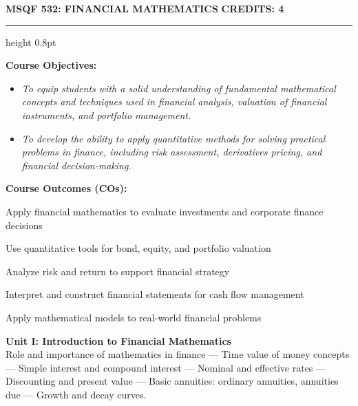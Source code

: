 
\newpage
\thispagestyle{plain}

\begin{center}
    {\large\textbf{MSQF 532: FINANCIAL MATHEMATICS}} \hfill {\large\textbf{CREDITS: 4}}
\end{center}
\vspace{-0.6em}
\hrule height 0.8pt
\vspace{0.6em}

\noindent\textbf{Course Objectives:}
\begin{itemize}[leftmargin=1.5em, label=$\bullet$, noitemsep, topsep=1pt, parsep=1pt]
    \item \textit{To equip students with a solid understanding of fundamental mathematical concepts and techniques used in financial analysis, valuation of financial instruments, and portfolio management.}
    \item \textit{To develop the ability to apply quantitative methods for solving practical problems in finance, including risk assessment, derivatives pricing, and financial decision-making.}
\end{itemize}

\vspace{0.4em}
\noindent\textbf{Course Outcomes (COs):}
\begin{description}[leftmargin=1.4cm, labelsep=0.4em, itemsep=1pt, topsep=1pt, parsep=0pt, font=\normalfont\textbf]
    \item[CO1:] Apply financial mathematics to evaluate investments and corporate finance decisions
    \item[CO2:] Use quantitative tools for bond, equity, and portfolio valuation
    \item[CO3:] Analyze risk and return to support financial strategy
    \item[CO4:] Interpret and construct financial statements for cash flow management
    \item[CO5:] Apply mathematical models to real-world financial problems
\end{description}

\vspace{0.4em}
\noindent\textbf{Unit I: Introduction to Financial Mathematics}\\
\small
Role and importance of mathematics in finance --- Time value of money concepts --- Simple interest and compound interest --- Nominal and effective rates --- Discounting and present value --- Basic annuities: ordinary annuities, annuities due --- Growth and decay curves.
\normalsize


